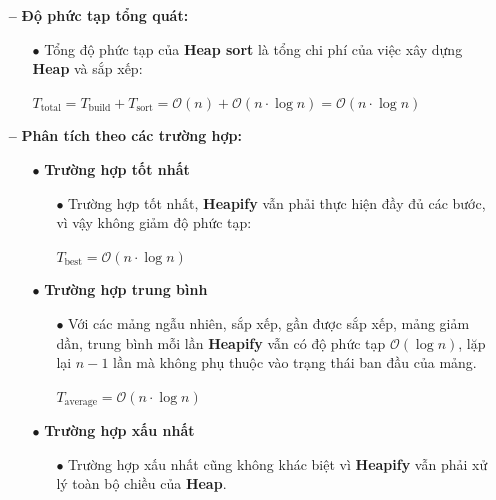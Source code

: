 \begin{itemize}
\begin{itemize}
\begin{itemize}
        \end{itemize}
    \end{itemize}
    \item [\textbf{--}] \textbf{Độ phức tạp tổng quát:}
    \begin{itemize}
        \item [$\bullet$] Tổng độ phức tạp của \textbf{Heap sort} là tổng chi phí của việc xây dựng \textbf{Heap} và sắp xếp:
        \begin{center}
            $T_{\text{total}} = T_{\text{build}} + T_{\text{sort}} = \mathcal{O}(n) + \mathcal{O}(n \cdot \log n) = \mathcal{O}(n \cdot \log n)$
        \end{center}
    \end{itemize}
    \item [\textbf{--}] \textbf{Phân tích theo các trường hợp:}
    \begin{itemize}
        \item [$\bullet$] \textbf{Trường hợp tốt nhất}
        \begin{itemize}
            \item [$\bullet$] Trường hợp tốt nhất, \textbf{Heapify} vẫn phải thực hiện đầy đủ các bước, vì vậy không giảm độ phức tạp:\cite{mishra2008selection}
            \begin{center}
                $T_{\text{best}} = \mathcal{O}(n \cdot \log n)$
            \end{center}
        \end{itemize}
        \item [$\bullet$] \textbf{Trường hợp trung bình}
        \begin{itemize}
            \item [$\bullet$] Với các mảng ngẫu nhiên, sắp xếp, gần được sắp xếp, mảng giảm dần, trung bình mỗi lần \textbf{Heapify} vẫn có độ phức tạp $\mathcal{O}(\log n)$, lặp lại $n-1$ lần mà không phụ thuộc vào trạng thái ban đầu của mảng.\cite{mishra2008selection}
            \begin{center}
                $T_{\text{average}} = \mathcal{O}(n \cdot \log n)$
            \end{center}
        \end{itemize}
        \item [$\bullet$] \textbf{Trường hợp xấu nhất}
        \begin{itemize}
            \item [$\bullet$] Trường hợp xấu nhất cũng không khác biệt vì \textbf{Heapify} vẫn phải xử lý toàn bộ chiều của \textbf{Heap}.\cite{mishra2008selection}

\end{itemize}
\end{itemize}
\end{itemize}
